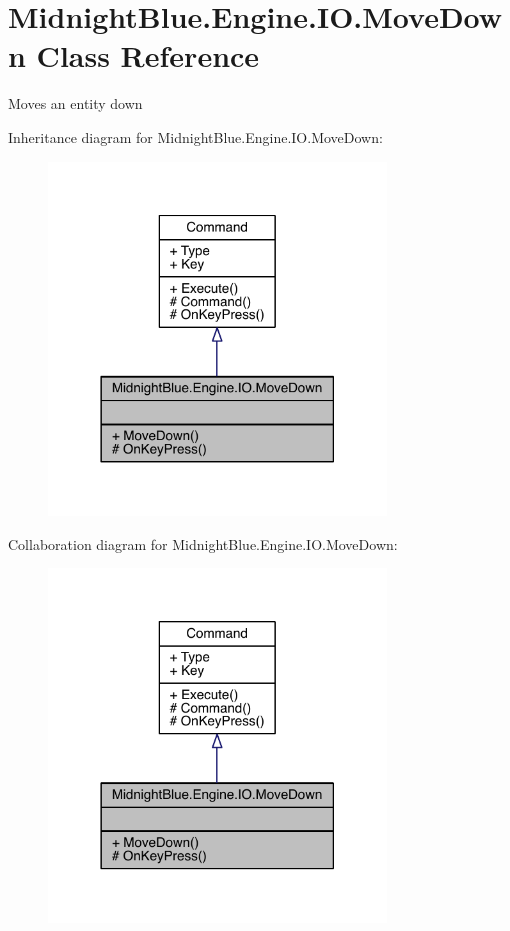 \hypertarget{class_midnight_blue_1_1_engine_1_1_i_o_1_1_move_down}{}\section{Midnight\+Blue.\+Engine.\+I\+O.\+Move\+Down Class Reference}
\label{class_midnight_blue_1_1_engine_1_1_i_o_1_1_move_down}


Moves an entity down  




Inheritance diagram for Midnight\+Blue.\+Engine.\+I\+O.\+Move\+Down\+:
\nopagebreak
\begin{figure}[H]
\begin{center}
\leavevmode
\includegraphics[width=254pt]{class_midnight_blue_1_1_engine_1_1_i_o_1_1_move_down__inherit__graph}
\end{center}
\end{figure}


Collaboration diagram for Midnight\+Blue.\+Engine.\+I\+O.\+Move\+Down\+:
\nopagebreak
\begin{figure}[H]
\begin{center}
\leavevmode
\includegraphics[width=254pt]{class_midnight_blue_1_1_engine_1_1_i_o_1_1_move_down__coll__graph}
\end{center}
\end{figure}
